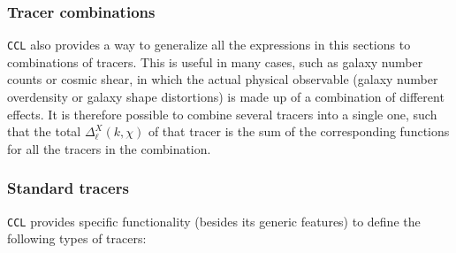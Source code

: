 \documentclass[\docopts]{\docclass}
\begin{document}
\subsubsection*{Tracer combinations}
  {\tt CCL} also provides a way to generalize all the expressions in this sections to combinations of tracers. This is useful in many cases, such as galaxy number counts or cosmic shear, in which the actual physical observable (galaxy number overdensity or galaxy shape distortions) is made up of a combination of different effects. It is therefore possible to combine several tracers into a single one, such that the total $\Delta^X_\ell(k,\chi)$ of that tracer is the sum of the corresponding functions for all the tracers in the combination.
  
\subsubsection*{Standard tracers}
  {\tt CCL} provides specific functionality (besides its generic features) to define the following types of tracers:
\end{document}
